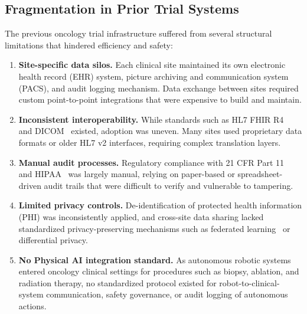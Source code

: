 \documentclass{article}
\begin{document}
\vspace{-0.1cm}

\subsection{Fragmentation in Prior Trial Systems}

The previous oncology trial infrastructure suffered from several structural limitations that hindered efficiency and safety:

\begin{enumerate}[leftmargin=*]
\item \textbf{Site-specific data silos.} Each clinical site maintained its own electronic health record (EHR) system, picture archiving and communication system (PACS), and audit logging mechanism. Data exchange between sites required custom point-to-point integrations that were expensive to build and maintain.

\item \textbf{Inconsistent interoperability.} While standards such as HL7 FHIR R4~\cite{fhir2019r4} and DICOM~\cite{dicom2024standard} existed, adoption was uneven. Many sites used proprietary data formats or older HL7 v2 interfaces, requiring complex translation layers.

\item \textbf{Manual audit processes.} Regulatory compliance with 21 CFR Part 11~\cite{fda2003part11} and HIPAA~\cite{hipaa1996} was largely manual, relying on paper-based or spreadsheet-driven audit trails that were difficult to verify and vulnerable to tampering.

\item \textbf{Limited privacy controls.} De-identification of protected health information (PHI) was inconsistently applied, and cross-site data sharing lacked standardized privacy-preserving mechanisms such as federated learning~\cite{mcmahan2017fedavg} or differential privacy.

\item \textbf{No Physical AI integration standard.} As autonomous robotic systems entered oncology clinical settings for procedures such as biopsy, ablation, and radiation therapy, no standardized protocol existed for robot-to-clinical-system communication, safety governance, or audit logging of autonomous actions.
\end{enumerate}

\tableofcontents


\vspace{0.05cm}
\end{document}
